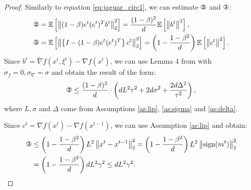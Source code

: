 \documentclass{article}
\theoremstyle{plain}
\theoremstyle{definition}
\theoremstyle{remark}
\newcommand{\expect}[1]{\mathbb{E}\left[ #1 \right]}
\newcommand{\norm}[1]{\left\| #1 \right\|}
\newcommand{\circledTwo}{\text{\ding{173}}}
\newcommand{\circledThree}{\text{\ding{174}}}
\begin{document}
\begin{proof}
        Similarly to equation \eqref{eq:jaguar_circ1}, we can estimate $\circledTwo$ and $\circledThree$: 
        \begin{align*}
            &\circledTwo = \expect{\norm{
                (1 - \beta) e^t (e^t)^T b^t
            }_2^2}
            =
            \frac{(1-\beta)^2}{d} \expect{\norm{b^t}^2},
            \\&
            \circledThree = \expect{\norm{
                \left\{I - (1-\beta)e^t (e^t)^T \right\} c^t}_2^2}
            =
            \left(1 - \frac{1 - \beta^2}{d} \right) \expect{\norm{c^t}^2} .
        \end{align*}
        Since $b^t = \widetilde{\nabla} f(x^t, \xi^t) - \nabla f(x^t)$, we can use Lemma 4 from \cite{veprikov2024new} with $\sigma_f = 0, \sigma_\nabla = \sigma$ and obtain the result of the form:
        \begin{align}
        \label{eq:jaguar_circ2}
            \circledTwo
            \leq
            \frac{(1-\beta)^2}{d} 
            \cdot
            \left( 
                d L^2 \tau^2 
                + 2 d \sigma^2 + \frac{2 d \Delta^2}{\tau^2}
            \right),
        \end{align}
        where $L, \sigma$ and $\Delta$ come from Assumptions \ref{as:lip}, \ref{as:sigma} and \ref{as:delta}. 
        
        Since $c^t = \nabla f(x^t) - \nabla f(x^{t-1})$, we can use Assumption \ref{as:lip} and obtain:
        \begin{align}
            \circledThree
            &\leq
            \left(1 - \frac{1 - \beta^2}{d} \right) L^2 \norm{x^t - x^{t-1}}_2^2 
            =
            \left(1 - \frac{1 - \beta^2}{d} \right) L^2 \norm{\text{sign} (m^t)}_2^2 
            \nonumber
            \\&= 
            \label{eq:jaguar_circ3}
            \left(1 - \frac{1 - \beta^2}{d} \right) d L^2 \gamma^2
            \leq
            d L^2 \gamma^2 .
        \end{align}


\end{proof}
\end{document}
